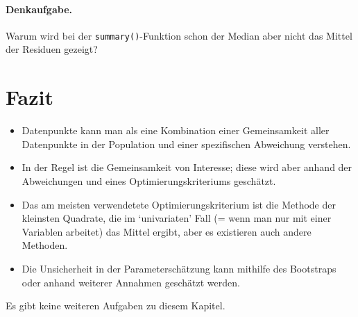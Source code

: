 \documentclass[oneside, 10pt]{book}\usepackage[]{graphicx}\usepackage[]{xcolor}
\begin{document}
\paragraph{Denkaufgabe.}
Warum wird bei der \texttt{summary()}-Funktion
schon der Median aber nicht das Mittel der Residuen gezeigt?


\section{Fazit}

\begin{itemize}
\item Datenpunkte kann man als eine Kombination einer
Gemeinsamkeit aller Datenpunkte in der Population und einer
spezifischen Abweichung verstehen.
\item In der Regel ist die Gemeinsamkeit von Interesse;
diese wird aber anhand der Abweichungen und eines
Optimierungskriteriums geschätzt.
\item Das am meisten verwendetete Optimierungskriterium
ist die Methode der kleinsten Quadrate, die im `univariaten' Fall
(= wenn man nur mit einer Variablen arbeitet) das Mittel ergibt,
aber es existieren auch andere Methoden.
\item Die Unsicherheit in der Parameterschätzung kann
mithilfe des Bootstraps oder anhand weiterer Annahmen geschätzt werden.
\end{itemize}

\bigskip

Es gibt keine weiteren Aufgaben zu diesem Kapitel.

%   
%   
%   
\end{document}
